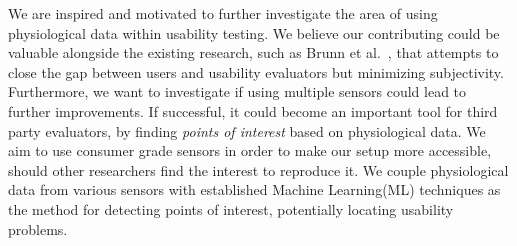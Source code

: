 We are inspired and motivated to further investigate the area of using physiological data within usability testing. We
believe our contributing could be valuable alongside the existing research, such as Brunn et al.~\cite{LH-paper}, that
attempts to close the gap between users and usability evaluators but minimizing subjectivity. Furthermore, we want to
investigate if using multiple sensors could lead to further improvements.
If successful, it could become an important tool for third party evaluators, by finding \textit{points of interest} based on physiological data. 
We aim to use consumer grade sensors in order to make our setup more accessible, should other researchers find the interest to reproduce
it. We couple physiological data from various sensors with established Machine Learning(ML) techniques as the method for
detecting points of interest, potentially locating usability problems.